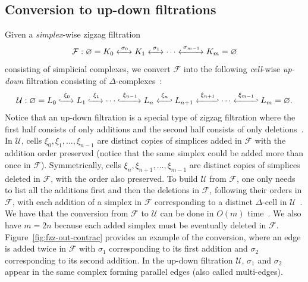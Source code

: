 \documentclass[letterpaper,11pt]{article}
\theoremstyle{mythmstyle}
\theoremstyle{mydefstyle}
\theoremstyle{plain}
\theoremstyle{definition}
\newcommand{\<}[1]{\langle #1\rangle}
\newcommand{\lbarrowspace}{\;}
\newcommand{\lrarrowsp}[1]{\xleftrightarrow{\lbarrowspace#1\lbarrowspace}}
\let\leftrightarrowsp\lrarrowsp
\newcommand{\inctosp}[1]{\xhookrightarrow{\lbarrowspace#1\lbarrowspace}}
\newcommand{\bakinctosp}[1]{\xhookleftarrow{\lbarrowspace#1\lbarrowspace}}
\let\emptyset\varnothing
\newcommand{\Fcal}{\mathcal{F}}
\newcommand{\Ucal}{\mathcal{U}}
\newcommand{\DG}{\Delta}
\newcommand{\sG}{\sigma}
\newcommand{\filtcnt}{m}
\newcommand{\simpcnt}{n}
\newcommand{\fsimp}[2]{\sigma_{#2}}
\newcommand{\Ud}{{\mathcal U}}
\newcommand{\ucplx}{L}
\newcommand{\usimp}{{\xi}}
\begin{document}
\subsection{Conversion to up-down filtrations}
\label{sec:fzz-up}



Given a \emph{simplex}-wise zigzag filtration 
\begin{equation}
\label{eqn:fzz-up-sec-filt}
\Fcal:
\emptyset=
K_0\leftrightarrowsp{\fsimp{}{0}} K_1\leftrightarrowsp{\fsimp{}{1}}
\cdots 
\leftrightarrowsp{\fsimp{}{\filtcnt-1}} K_\filtcnt
=\emptyset
\end{equation}
consisting of simplicial complexes,
we convert $\Fcal$ into the following \textit{cell}-wise 
\emph{up-down} filtration
consisting of $\DG$-complexes~\cite{dey2022fast}:
\begin{equation*}
\Ud:\emptyset=\ucplx_0\inctosp{\usimp_0}
\ucplx_1\inctosp{\usimp_{1}}
\cdots\inctosp{\usimp_{\simpcnt-1}} 
\ucplx_{\simpcnt}
\bakinctosp{\usimp_{\simpcnt}}
\ucplx_{\simpcnt+1}
\bakinctosp{\usimp_{\simpcnt+1}}
\cdots
\bakinctosp{\usimp_{\filtcnt-1}} \ucplx_{\filtcnt}=\emptyset.
\end{equation*}
Notice that an up-down filtration is a special type of 
zigzag filtration where the first half consists of only additions
and the second half consists of only deletions~\cite{carlsson2009zigzag-realvalue}.
In $\Ucal$,
cells $\usimp_0,\usimp_1,\ldots,\usimp_{\simpcnt-1}$ 
are 
distinct copies of simplices added in $\Fcal$ 
with the addition order preserved
(notice that the same simplex could be 
added  more than once in $\Fcal$).
Symmetrically,
cells 
$\usimp_{\simpcnt},\usimp_{\simpcnt+1},\ldots,\usimp_{\filtcnt-1}$ 
are 
distinct
copies of simplices deleted in $\Fcal$,
with the order also preserved.
To build $\Ucal$ 
from ${\Fcal}$, 
one only needs to 
list all the additions first and then the deletions in ${\Fcal}$,
following their orders in ${\Fcal}$,
with each addition of a simplex in $\Fcal$ corresponding to a distinct $\DG$-cell in $\Ucal$~\cite{dey2022fast}.
We  have that the conversion from $\Fcal$ to $\Ucal$
can be done in $O(\filtcnt)$ time~\cite{dey2022fast}.
We also have $\filtcnt=2\simpcnt$
because each added simplex
must be eventually deleted in ${\Fcal}$.
Figure~\ref{fig:fzz-out-contrac}
provides an example of the conversion, where an edge 
is added twice in $\Fcal$ with $\sG_1$ corresponding to its first addition
and $\sG_2$ corresponding to its second addition.
In the up-down filtration $\Ucal$,
$\sG_1$ and $\sG_2$ appear in the same complex forming parallel edges 
(also called multi-edges).
\end{document}
